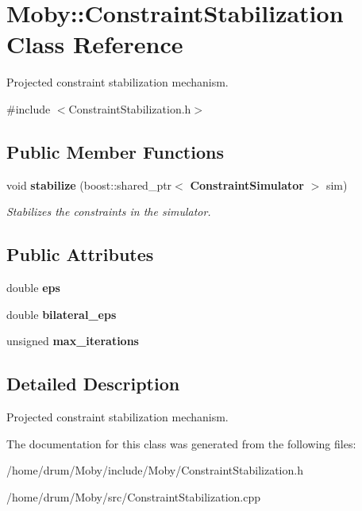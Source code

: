 \section{Moby\-:\-:Constraint\-Stabilization Class Reference}
\label{classMoby_1_1ConstraintStabilization}


Projected constraint stabilization mechanism.  




{\ttfamily \#include $<$Constraint\-Stabilization.\-h$>$}

\subsection*{Public Member Functions}
\begin{DoxyCompactItemize}
\item 
void {\bf stabilize} (boost\-::shared\-\_\-ptr$<$ {\bf Constraint\-Simulator} $>$ sim)\label{classMoby_1_1ConstraintStabilization_a0e32da79f7bcbf9bb07a2ce0f3c01fff}

\begin{DoxyCompactList}\small\item\em Stabilizes the constraints in the simulator. \end{DoxyCompactList}\end{DoxyCompactItemize}
\subsection*{Public Attributes}
\begin{DoxyCompactItemize}
\item 
double {\bfseries eps}\label{classMoby_1_1ConstraintStabilization_a8f4643aff43cb4ad52e44086a18ce67c}

\item 
double {\bfseries bilateral\-\_\-eps}\label{classMoby_1_1ConstraintStabilization_a0779a49fc72a73df64bac7f75b49a368}

\item 
unsigned {\bfseries max\-\_\-iterations}\label{classMoby_1_1ConstraintStabilization_a31a8459ca9351c79a9ce4e65aeb9cf1a}

\end{DoxyCompactItemize}


\subsection{Detailed Description}
Projected constraint stabilization mechanism. 

The documentation for this class was generated from the following files\-:\begin{DoxyCompactItemize}
\item 
/home/drum/\-Moby/include/\-Moby/Constraint\-Stabilization.\-h\item 
/home/drum/\-Moby/src/Constraint\-Stabilization.\-cpp\end{DoxyCompactItemize}
